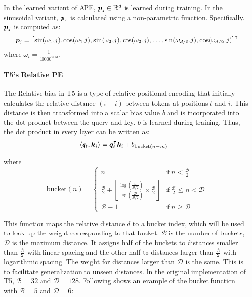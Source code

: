 \documentclass{article}
\begin{document}
In the learned variant of APE, ${\bm{p}}_j \in \mathbb{R}^d$ is learned during training. In the sinusoidal variant, ${\bm{p}}_j$ is calculated using a non-parametric function. Specifically, ${\bm{p}}_j$ is computed as:
\begin{align}
  \label{eq:ape_sinusoidal}
  {\bm{p}}_j = \left[\sin(\omega_1.j), \cos(\omega_1.j), \sin(\omega_2.j), \cos(\omega_2.j), \ldots, \sin(\omega_{d/2}.j), \cos(\omega_{d/2}.j) \right]^\intercal
\end{align}
where $\omega_i = \frac{1}{10000^{2i/d}}$.

\paragraph{T5's Relative PE}
The Relative bias in T5 is a type of relative positional encoding that initially calculates the relative distance $(t-i)$ between tokens at positions $t$ and $i$. This distance is then transformed into a scalar bias value $b$ and is incorporated into the dot product between the query and key. $b$ is learned during training.
Thus, the dot product in every layer can be written as:
\begin{align}
  \label{eq:t5_relative_bias}
  \langle {\bm{q}}_t, {\bm{k}}_i \rangle & = {\bm{q}}_t^\intercal {\bm{k}}_i + b_{\mathrm{bucket}(n-m)}
\end{align}

where
\[
  \mathrm{bucket}(n) =
  \begin{cases}
    n                                                                                                                                                                                       & \text{if}\ n < \frac{\mathcal{B}}{2}                  \\
    \frac{\mathcal{B}}{2} + \left\lfloor \frac{\log{\left(\frac{n}{\mathcal{B}/2}\right)}}{\log{\left(\frac{\mathcal{D}}{\mathcal{B}/2}\right)}} \times \frac{\mathcal{B}}{2} \right\rfloor & \text{if}\ \frac{\mathcal{B}}{2} \leq n < \mathcal{D} \\
    \mathcal{B} - 1                                                                                                                                                                         & \text{if}\ n \geq \mathcal{D}
  \end{cases}
\]


This function maps the relative distance $d$ to a bucket index, which will be used to look up the weight corresponding to that bucket. $\mathcal{B}$ is the number of buckets, $\mathcal{D}$ is the maximum distance. It assigns half of the buckets to distances smaller than $\frac{\mathcal{D}}{2}$ with linear spacing and the other half to distances larger than $\frac{\mathcal{D}}{2}$ with logarithmic spacing. The weight for distances larger than $\mathcal{D}$ is the same. This is to facilitate generalization to unseen distances. In the original implementation of T5, $\mathcal{B} = 32$ and $\mathcal{D} = 128$. Following shows an example of the bucket function with $\mathcal{B} = 5$ and $\mathcal{D} = 6$:
\end{document}
